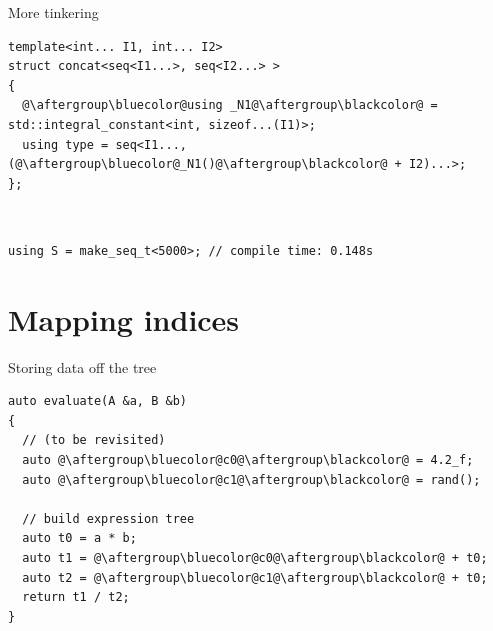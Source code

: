 \documentclass[xcolor=dvipsnames]{beamer}
\begin{document}
\begin{frame}[fragile]{More tinkering}
\begin{lstlisting}
template<int... I1, int... I2>
struct concat<seq<I1...>, seq<I2...> >
{
  @\aftergroup\bluecolor@using _N1@\aftergroup\blackcolor@ = std::integral_constant<int, sizeof...(I1)>;
  using type = seq<I1..., (@\aftergroup\bluecolor@_N1()@\aftergroup\blackcolor@ + I2)...>;
};
\end{lstlisting}

~

\begin{lstlisting}
using S = make_seq_t<5000>; // compile time: 0.148s
\end{lstlisting}
\end{frame}


\section{Mapping indices}


\begin{frame}[fragile]{Storing data off the tree}
\begin{lstlisting}
auto evaluate(A &a, B &b)
{
  // (to be revisited)
  auto @\aftergroup\bluecolor@c0@\aftergroup\blackcolor@ = 4.2_f;
  auto @\aftergroup\bluecolor@c1@\aftergroup\blackcolor@ = rand();

  // build expression tree
  auto t0 = a * b;
  auto t1 = @\aftergroup\bluecolor@c0@\aftergroup\blackcolor@ + t0;
  auto t2 = @\aftergroup\bluecolor@c1@\aftergroup\blackcolor@ + t0;
  return t1 / t2;
}
\end{lstlisting}
\end{frame}
\end{document}
